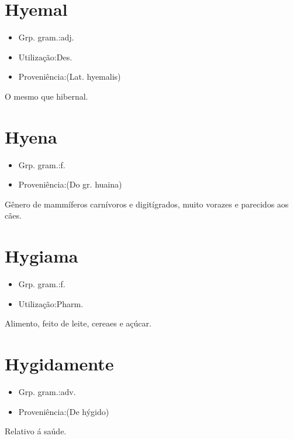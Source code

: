 \documentclass{article}
\begin{document}
\section{Hyemal}
\begin{itemize}
\item {Grp. gram.:adj.}
\end{itemize}
\begin{itemize}
\item {Utilização:Des.}
\end{itemize}
\begin{itemize}
\item {Proveniência:(Lat. \textunderscore hyemalis\textunderscore )}
\end{itemize}
O mesmo que \textunderscore hibernal\textunderscore .
\section{Hyena}
\begin{itemize}
\item {Grp. gram.:f.}
\end{itemize}
\begin{itemize}
\item {Proveniência:(Do gr. \textunderscore huaina\textunderscore )}
\end{itemize}
Gênero de mammíferos carnívoros e digitígrados, muito vorazes e parecidos aos cães.
\section{Hygiama}
\begin{itemize}
\item {Grp. gram.:f.}
\end{itemize}
\begin{itemize}
\item {Utilização:Pharm.}
\end{itemize}
Alimento, feito de leite, cereaes e açúcar.
\section{Hygidamente}
\begin{itemize}
\item {Grp. gram.:adv.}
\end{itemize}
\begin{itemize}
\item {Proveniência:(De \textunderscore hýgido\textunderscore )}
\end{itemize}
Relativo á saúde.
\end{document}
